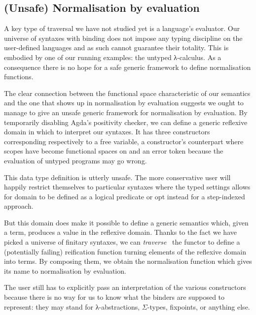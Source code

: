 \subsection{(Unsafe) Normalisation by evaluation}\label{section:nbyeval}

A key type of traversal we have not studied yet is a language's
evaluator. Our universe of syntaxes with binding does not impose
any typing discipline on the user-defined languages and as such
cannot guarantee their totality. This is embodied by one of our running
examples: the untyped λ-calculus. As a consequence there
is no hope for a safe generic framework to define normalisation
functions.

The clear connection between the  functional space
characteristic of our semantics and the one that shows up in
normalisation by evaluation suggests we ought to manage to
give an unsafe generic framework for normalisation by evaluation.
By temporarily disabling Agda's positivity checker,
we can define a generic reflexive domain  in which to
interpret our syntaxes. It has three constructors corresponding
respectively to a free variable, a constructor's counterpart where
scopes have become  functional spaces on  and
an error token because the evaluation of untyped programs may go wrong.

\begin{agdasnippet}
\end{agdasnippet}

This data type definition is utterly unsafe. The more conservative
user will happily restrict themselves to particular syntaxes where
the typed settings allows for domain to be defined as a logical
predicate or opt instead for a step-indexed approach.

But this domain does make it possible to define a generic 
semantics which, given a term, produces a value in the reflexive
domain. Thanks to the fact we have picked a universe of finitary syntaxes, we
can \emph{traverse}~\cite{mcbride_paterson_2008,DBLP:journals/jfp/GibbonsO09}
the functor to define
a (potentially failing) reification function turning elements of the
reflexive domain into terms. By composing them, we obtain the
normalisation function which gives its name to normalisation by
evaluation.

The user still has to explicitly pass an interpretation of
the various constructors because there is no way for us to
know what the binders are supposed to represent: they may
stand for λ-abstractions, $\Sigma$-types, fixpoints, or
anything else.

